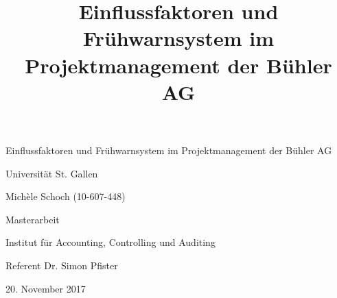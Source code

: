 \documentclass[11pt]{report} %
\title{Einflussfaktoren und Frühwarnsystem im Projektmanagement der Bühler AG}
\begin{document}
	
\begin{titlepage}
\vspace*{4cm}
\begin{center}
{\LARGE Einflussfaktoren und Frühwarnsystem im Projektmanagement der Bühler AG\par}
\vspace{4cm}
{\Large Universität St. Gallen \par}
{\Large Michèle Schoch (10-607-448)\par}
\vspace{2cm}
{\Large Masterarbeit\par}
{\Large Institut für Accounting, Controlling und Auditing\par}
\vspace{1cm}
{\Large Referent Dr. Simon Pfister\par}
\vspace{1cm}
{\Large 20. November 2017\par}
\end{center}
\clearpage
\end{titlepage}


\setlength{\parindent}{0pt}
\tableofcontents\newpage

\printglossary[style = super, title=Abkürzungsverzeichnis, toctitle = Abkürzungsverzeichnis]
\newpage

\listoffigures\newpage
\listoftables\newpage
\newpage
\newpage
\newpage
\newpage
\newpage
\newpage

%
\newpage
\renewcommand\appendixtocname{Anhang}
\begin{appendices}
	
\end{appendices}
\end{document}
